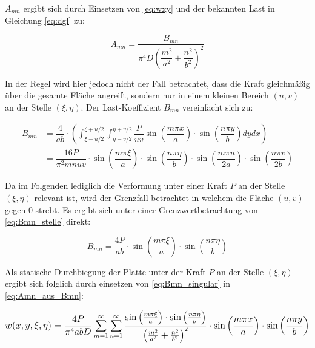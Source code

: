 $A_{mn}$ ergibt sich durch Einsetzen von \ref{eq:wxy} und der bekannten Last in Gleichung \ref{eq:dgl} zu:

\begin{equation}
A_{mn} = \dfrac{B_{mn}}{\pi^4 D \left(\dfrac{m^2}{a^2} + \dfrac{n^2}{b^2} \right)^2}
\label{eq:Amn_aus_Bmn}
\end{equation}

In der Regel wird hier jedoch nicht der Fall betrachtet, dass die Kraft gleichmäßig über die gesamte Fläche angreift, sondern nur in einem kleinen Bereich $(u,v)$ an der Stelle $(\xi, \eta)$. Der Last-Koeffizient $B_{mn}$ vereinfacht sich zu:

\begin{align}
B_{mn} &= \dfrac{4}{ab} \cdot \left( \int_{\xi-u/2}^{\xi+u/2} \int_{\eta - v/2}^{\eta + v/2} \dfrac{P}{u v}
\sin\left(\dfrac{m \pi x}{a}\right) \cdot \sin\left( \dfrac{n \pi y}{b} \right)dy dx\right) \\
&= \dfrac{16P}{\pi^2 m n u v} 
\cdot \sin\left(\dfrac{m \pi \xi}{a}\right) 
\cdot \sin\left(\dfrac{n \pi \eta}{b}\right) 
\cdot \sin\left(\dfrac{m \pi u}{2a}\right) 
\cdot \sin\left(\dfrac{n \pi v}{2b}\right)
\label{eq:Bmn_stelle}
\end{align}

Da im Folgenden lediglich die Verformung unter einer Kraft $P$ an der Stelle $(\xi, \eta)$ relevant ist, wird der Grenzfall betrachtet in welchem die Fläche $(u,v)$ gegen 0 strebt. Es ergibt sich unter einer Grenzwertbetrachtung von \ref{eq:Bmn_stelle} direkt:

\begin{equation}
B_{mn} = \dfrac{4P}{a b} 
\cdot \sin\left(\dfrac{m \pi \xi}{a}\right) 
\cdot \sin\left(\dfrac{n \pi \eta}{b}\right) 
\label{eq:Bmn_singular}
\end{equation}

Als statische Durchbiegung der Platte unter der Kraft $P$ an der Stelle $(\xi, \eta)$ ergibt sich folglich durch einsetzen von \ref{eq:Bmn_singular} in \ref{eq:Amn_aus_Bmn}:
 
\begin{equation}
 \mathlarger{
 	w(x,y,\xi,\eta) = \frac{4P}{\pi^4 a b D} 
 	\sum_{m = 1}^{\infty} \sum_{n = 1}^{\infty}
 	\frac{
 		\sin\left(\frac{m \pi \xi}{a}\right) 
 		\cdot \sin\left(\frac{n \pi \eta}{b}\right) 
 	}{
 		\left( 
 		\frac{m^2}{a^2} +
 		\frac{n^2}{b^2}
 		\right)^2
 	}
 	\cdot \sin\left(\frac{m \pi x}{a}\right) 
 	\cdot \sin\left(\frac{n \pi y}{b}\right) 
 }
 \end{equation}
 
